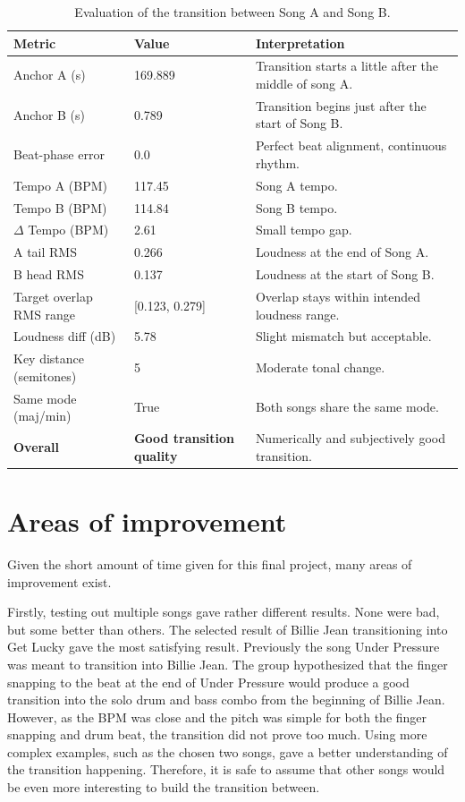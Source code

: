 \documentclass[12pt]{article}
\begin{document}
\begin{table}[H]
\centering
\begin{tabular}{l l p{5.5cm}} 
\hline
\textbf{Metric} & \textbf{Value} & \textbf{Interpretation} \\
\hline
Anchor A (s) & 169.889 & Transition starts a little after the middle of song A. \\
Anchor B (s) & 0.789 & Transition begins just after the start of Song B. \\
Beat-phase error & 0.0 & Perfect beat alignment, continuous rhythm. \\
Tempo A (BPM) & 117.45 & Song A tempo. \\
Tempo B (BPM) & 114.84 & Song B tempo. \\
$\Delta$ Tempo (BPM) & 2.61 & Small tempo gap. \\
A tail RMS & 0.266 & Loudness at the end of Song A. \\
B head RMS & 0.137 & Loudness at the start of Song B. \\
Target overlap RMS range & [0.123, 0.279] & Overlap stays within intended loudness range. \\
Loudness diff (dB) & 5.78 & Slight mismatch but acceptable. \\
Key distance (semitones) & 5 & Moderate tonal change. \\
Same mode (maj/min) & True & Both songs share the same mode. \\
\hline
\textbf{Overall} & \textbf{Good transition quality} & Numerically and subjectively good transition. \\ 
\hline
\end{tabular}
\caption{Evaluation of the transition between Song A and Song B.}
\label{tab:evaluation}
\end{table}





\section{Areas of improvement}

Given the short amount of time given for this final project, many areas of improvement exist.

Firstly, testing out multiple songs gave rather different results. None were bad, but some better than others. The selected result of Billie Jean transitioning into Get Lucky gave the most satisfying result. Previously the song Under Pressure was meant to transition into Billie Jean. The group hypothesized that the finger snapping to the beat at the end of Under Pressure would produce a good transition into the solo drum and bass combo from the beginning of Billie Jean. However, as the BPM was close and the pitch was simple for  both the finger snapping and drum beat, the transition did not prove too much. Using more complex examples, such as the chosen two songs, gave a better understanding of the transition happening. Therefore, it is safe to assume that other songs would be even more interesting to build the transition between.
\end{document}
